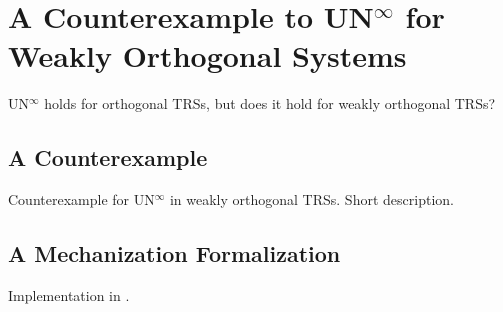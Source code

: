\chapter{A Counterexample to \texorpdfstring{UN$^\infty$}{UN} for Weakly
  Orthogonal Systems}\label{chap:unwo}


UN$^\infty$ holds for orthogonal TRSs, but does it hold for weakly orthogonal TRSs?


\section{A Counterexample}

Counterexample for UN$^\infty$ in weakly orthogonal TRSs. Short description.


\section{A Mechanization Formalization}

Implementation in \Coq.
